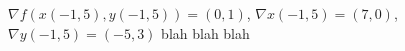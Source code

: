 {
$\nabla f(x(-1,5),y(-1,5)) = (0,1)$, $\nabla x(-1,5) =(7,0)$, $\nabla y(-1,5) = (-5,3)$
}
{
blah blah blah
}

